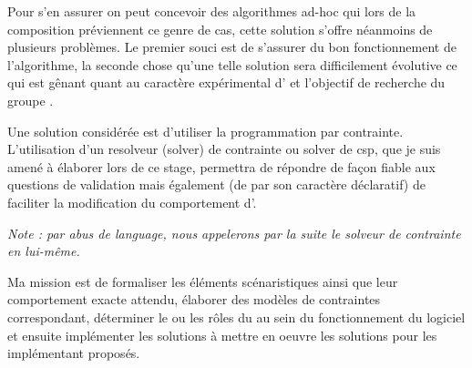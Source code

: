 Pour s'en assurer on peut concevoir des algorithmes ad-hoc qui lors de la composition préviennent ce genre de cas, cette solution s'offre néanmoins de plusieurs problèmes. Le premier souci est de s'assurer du bon fonctionnement de l'algorithme, la seconde chose qu'une telle solution sera difficilement évolutive ce qui est gênant quant au caractère expérimental d'\iscore{} et l'objectif de recherche du groupe \ossia{}.

Une solution considérée est d'utiliser la programmation par contrainte. L'utilisation d'un resolveur (solver) de contrainte ou solver de \acrshort{csp}, que je suis amené à élaborer lors de ce stage, permettra de répondre de façon fiable aux questions de validation mais également (de par son caractère déclaratif) de faciliter la modification du comportement d'\iscore{}.

\emph{Note : par abus de language, nous appelerons par la suite \csp{} le solveur de contrainte en lui-même.}

Ma mission est de formaliser les éléments scénaristiques ainsi que leur comportement exacte attendu, élaborer des modèles de contraintes correspondant, déterminer le ou les rôles du \csp{} au sein du fonctionnement du logiciel et ensuite implémenter les solutions à mettre en oeuvre les solutions pour les implémentant proposés.


\printglossary[type=\acronymtype]
 
\printglossary